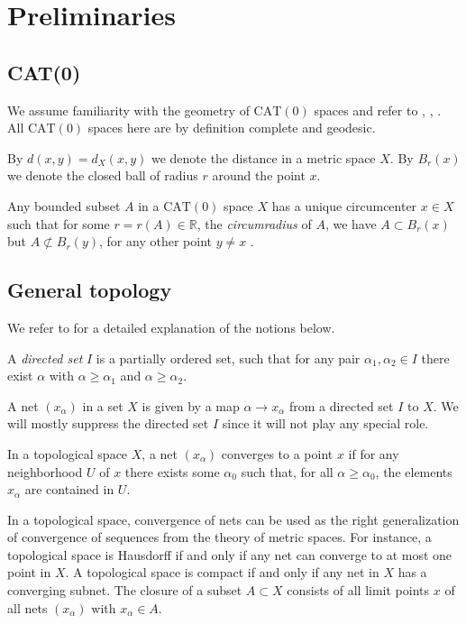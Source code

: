 \documentclass[12pt,leqno]{amsart}
\numberwithin{equation}{section}
\theoremstyle{remark}
\newcommand{\CAT}{\mathrm{CAT}}
\newcommand{\R}{\mathbb{R}}
\begin{document}
\section{Preliminaries} \label{sec: prel}

\subsection{CAT(0)}
We assume familiarity with the geometry of $\CAT(0)$ spaces and refer to \cite{BH}, \cite{AKP}, \cite{AKP_inv}. 
All $\CAT(0)$ spaces here are by definition complete and geodesic.

By $d(x,y)=d_X(x,y)$ we denote the distance in a metric space $X$.
By $B_r(x)$ we denote the closed ball of radius $r$ around the point $x$.

Any bounded subset $A$ in a $\CAT(0)$ space $X$ has a unique circumcenter $x\in X$ such that 
for some $r=r(A)\in \R$, the \emph{circumradius} of $A$, we have $A\subset B_r(x)$ but $A\not\subset B_r(y)$,
for any other point $y\neq x$ \cite{BH}.

\subsection{General topology}
We refer to \cite{Engel} for a detailed explanation of the notions below.

A \emph{directed set} $I$ is a partially ordered set, such that for any pair $\alpha_1, \alpha_2 \in I$ there exist
$\alpha$ with $\alpha \geq \alpha _1$ and $\alpha \geq \alpha _2$.

A net $(x_{\alpha})$ in a set $X$ is given by a map $\alpha \to x_{\alpha}$ from a directed set $I$ to $X$.
We will mostly suppress the directed set $I$ since it will not play any special role.

In a topological space $X$, a net $(x_{\alpha})$ converges to a point $x$ if for any neighborhood $U$ of $x$
there exists some $\alpha _0$ such that, for all $\alpha \geq \alpha _0$, the elements $x_{\alpha}$ are contained in $U$.

In a topological space, convergence of nets can be used as the right generalization of convergence of sequences from the theory of metric spaces.
For instance, a topological space is Hausdorff if and only if any net can converge to at most one point in $X$.
A topological space is compact if and only if any net in $X$ has a converging subnet.
The closure of a subset $A\subset X$ consists of all limit points $x$ of all nets $(x_{\alpha})$ with $x_{\alpha} \in A$. 
\end{document}
